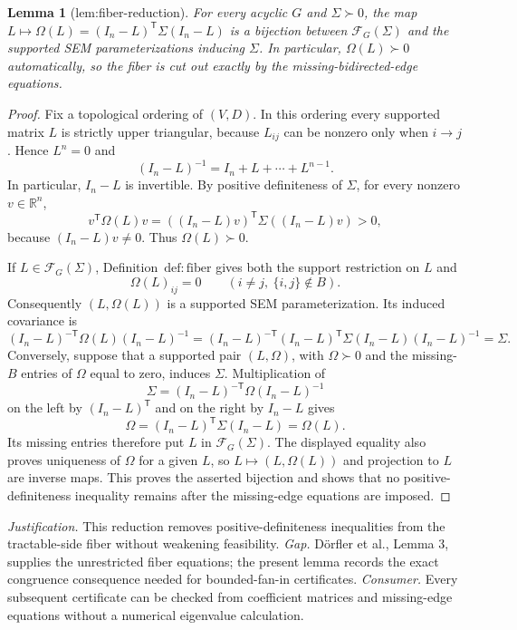 \documentclass{article}
\newtheorem{lemma}{Lemma}
\begin{document}
\begin{lemma}[lem:fiber-reduction]\label{lem:fiber-reduction}
For every acyclic \(G\) and \(\Sigma\succ0\), the map \(L\mapsto\Omega(L)=(I_n-L)^{\mathsf T}\Sigma(I_n-L)\) is a bijection between \(\mathcal F_G(\Sigma)\) and the supported SEM parameterizations inducing \(\Sigma\). In particular, \(\Omega(L)\succ0\) automatically, so the fiber is cut out exactly by the missing-bidirected-edge equations.
\end{lemma}
\begin{proof}
Fix a topological ordering of \((V,D)\).  In this ordering every supported matrix \(L\) is strictly upper triangular, because \(L_{ij}\) can be nonzero only when \(i\to j\).  Hence \(L^n=0\) and
\[
(I_n-L)^{-1}=I_n+L+\cdots+L^{n-1}.
\]
In particular, \(I_n-L\) is invertible.  By positive definiteness of \(\Sigma\), for every nonzero \(v\in\mathbb R^n\),
\[
v^{\mathsf T}\Omega(L)v
=((I_n-L)v)^{\mathsf T}\Sigma((I_n-L)v)>0,
\]
because \((I_n-L)v\ne0\).  Thus \(\Omega(L)\succ0\).

If \(L\in\mathcal F_G(\Sigma)\), Definition~\(\mathrm{def:fiber}\) gives both the support restriction on \(L\) and
\[
\Omega(L)_{ij}=0\qquad(i\ne j,\ \{i,j\}\notin B).
\]
Consequently \((L,\Omega(L))\) is a supported SEM parameterization.  Its induced covariance is
\[
(I_n-L)^{-\mathsf T}\Omega(L)(I_n-L)^{-1}
=(I_n-L)^{-\mathsf T}(I_n-L)^{\mathsf T}\Sigma(I_n-L)(I_n-L)^{-1}
=\Sigma.
\]
Conversely, suppose that a supported pair \((L,\Omega)\), with \(\Omega\succ0\) and the missing-\(B\) entries of \(\Omega\) equal to zero, induces \(\Sigma\).  Multiplication of
\[
\Sigma=(I_n-L)^{-\mathsf T}\Omega(I_n-L)^{-1}
\]
on the left by \((I_n-L)^{\mathsf T}\) and on the right by \(I_n-L\) gives
\[
\Omega=(I_n-L)^{\mathsf T}\Sigma(I_n-L)=\Omega(L).
\]
Its missing entries therefore put \(L\) in \(\mathcal F_G(\Sigma)\).  The displayed equality also proves uniqueness of \(\Omega\) for a given \(L\), so \(L\mapsto(L,\Omega(L))\) and projection to \(L\) are inverse maps.  This proves the asserted bijection and shows that no positive-definiteness inequality remains after the missing-edge equations are imposed.
\end{proof}
\par\smallskip\noindent \textit{Justification.} This reduction removes positive-definiteness inequalities from the tractable-side fiber without weakening feasibility. \textit{Gap.} Dörfler et al., Lemma 3, supplies the unrestricted fiber equations; the present lemma records the exact congruence consequence needed for bounded-fan-in certificates. \textit{Consumer.} Every subsequent certificate can be checked from coefficient matrices and missing-edge equations without a numerical eigenvalue calculation.
\end{document}
